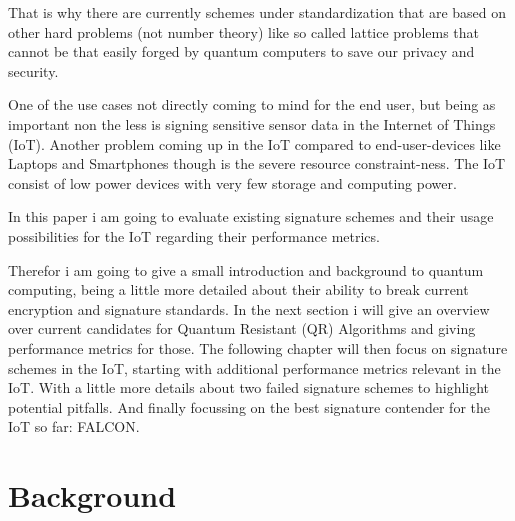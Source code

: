 \documentclass[conference]{IEEEtran}
\begin{document}
That is why there are currently schemes under standardization\cite{PQClean-GH} that are based on other hard problems (not number theory) like so called lattice problems that cannot be that easily forged by quantum computers to save our privacy and security.

One of the use cases not directly coming to mind for the end user, but being as important non the less is signing sensitive sensor data in the Internet of Things (IoT).
Another problem coming up in the IoT compared to end-user-devices like Laptops and Smartphones though is the severe resource constraint-ness. 
The IoT consist of low power devices with very few storage and computing power.

In this paper i am going to evaluate existing signature schemes and their usage possibilities for the IoT regarding their performance metrics.

Therefor i am going to give a small introduction and background to quantum computing, being a little more detailed about their ability to break current encryption and signature standards.
In the next section i will give an overview over current candidates for Quantum Resistant (QR) Algorithms and giving performance metrics for those.
The following chapter will then focus on signature schemes in the IoT, starting with additional performance metrics relevant in the IoT.
With a little more details about two failed signature schemes to highlight potential pitfalls. 
And finally focussing on the best signature contender for the IoT so far: FALCON.

\section{Background}\label{background}
\end{document}
